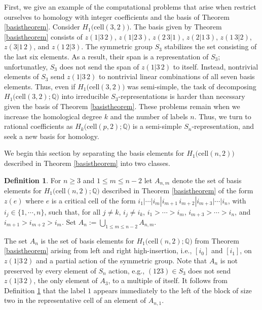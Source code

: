 \documentclass[12py]{amsart}%
\theoremstyle{definition}\newtheorem{definition}[thm]{Definition}
\theoremstyle{definition}
\newtheorem{defn}[thm]{Definition}
\newcommand{\Q}{\ensuremath{\mathbb{Q}}}
\begin{document}
First, we give an example of the computational problems that arise when restrict ourselves to homology with integer coefficients and the basis of Theorem \ref{basistheorem}. Consider $H_{1}\big(\text{cell}(3,2)\big)$. The basis given by Theorem \ref{basistheorem} consists of $z(1|3\,2)$, $z(1|2\,3)$, $z(2\,3|1)$, $z(2|1\,3)$, $z(1\,3|2)$, $z(3|1\,2)$, and $z(1\,2|3)$. The symmetric group $S_{3}$ stabilizes the set consisting of the last six elements. As a result, their span is a representation of $S_{3}$; unfortunatley, $S_{3}$ does not send the span of $z(1|3\,2)$ to itself. Instead, nontrivial elements of $S_{3}$ send $z(1|3\,2)$ to nontrivial linear combinations of all seven basis elements. Thus, even if $H_{1}\big(\text{cell}(3,2)\big)$ was semi-simple, the task of decomposing $H_{1}\big(\text{cell}(3,2);\Q\big)$ into irreducible $S_{3}$-representations is harder than necessary given the basis of Theorem \ref{basistheorem}. These problems remain when we increase the homological degree $k$ and the number of labels $n$. Thus, we turn to rational coefficients as $H_{k}\big(\text{cell}(p,2);\Q\big)$ is a semi-simple $S_{n}$-representation, and seek a new basis for homology.

We begin this section by separating the basis elements for $H_{1}\big(\text{cell}(n,2)\big)$ described in Theorem \ref{basistheorem} into two classes.

\begin{defn}\label{Adef}
For $n\ge 3$ and $1\le m\le n-2$ let \emph{$A_{n,m}$} denote the set of basis elements for $H_{1}\big(\text{cell}(n,2);\Q\big)$ described in Theorem \ref{basistheorem} of the form $z(e)$ where $e$ is a critical cell of the form $i_{1}|\cdots|i_{m}|i_{m+1}\,i_{m+2}|i_{m+3}|\cdots|i_{n}$, with $i_{j}\in \{1,\cdots, n\}$, such that, for all $j\neq k$, $i_{j}\neq i_{k}$, $i_{1}>\cdots>i_{m}$, $i_{m+3}>\cdots>i_{n}$, and $i_{m+1}>i_{m+2}>i_{m}$. Set $A_{n}:=\bigcup_{1\le m\le n-2}A_{n, m}$.
\end{defn}

The set $A_{n}$ is the set of basis elements for $H_{1}\big(\text{cell}(n,2); \Q\big)$ from Theorem \ref{basistheorem} arising from left and right high-insertion, i.e., $[i_{0}]$ and $[i_{1}]$, on $z(1|3\,2)$ and a partial action of the symmetric group. Note that $A_{n}$ is not preserved by every element of $S_{n}$ action, e.g., $(123)\in S_{3}$ does not send $z(1|3\,2)$, the only element of $A_{3}$, to a multiple of itself. It follows from Definition \ref{Adef} that the label $1$ appears immediately to the left of the block of size two in the representative cell of an element of $A_{n,1}$.
\end{document}
